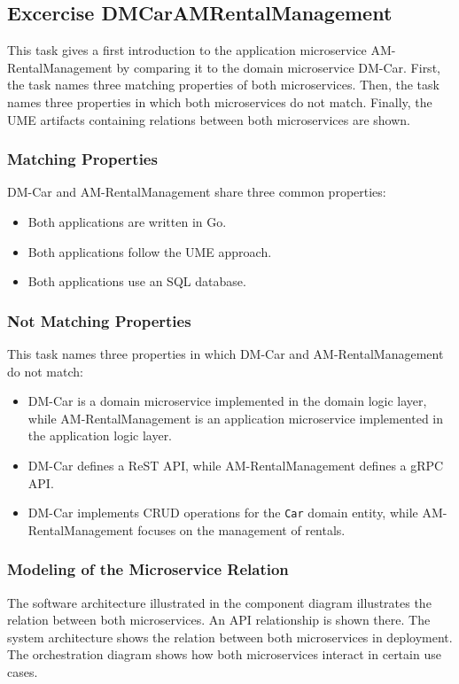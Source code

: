 \subsection{Excercise DMCarAMRentalManagement}
This task gives a first introduction to the application microservice AM-RentalManagement by comparing it to the domain microservice DM-Car.
First, the task names three matching properties of both microservices.
Then, the task names three properties in which both microservices do not match.
Finally, the UME artifacts containing relations between both microservices are shown.

\subsubsection*{Matching Properties}
DM-Car and AM-RentalManagement share three common properties:
\begin{itemize}
    \item Both applications are written in Go.
    \item Both applications follow the UME approach.
    \item Both applications use an SQL database.
\end{itemize}
\subsubsection*{Not Matching Properties}
This task names three properties in which DM-Car and AM-RentalManagement do not match:
\begin{itemize}
    \item DM-Car is a domain microservice implemented in the domain logic layer, while AM-RentalManagement is an application microservice implemented in the application logic layer.
    \item DM-Car defines a ReST API, while AM-RentalManagement defines a gRPC API.
    \item DM-Car implements CRUD operations for the \texttt{Car} domain entity, while \hfill \linebreak AM-RentalManagement focuses on the management of rentals.
\end{itemize}

\subsubsection*{Modeling of the Microservice Relation}
The software architecture illustrated in the component diagram illustrates the relation between both microservices.
An API relationship is shown there.
The system architecture shows the relation between both microservices in deployment.
The orchestration diagram shows how both microservices interact in certain use cases.